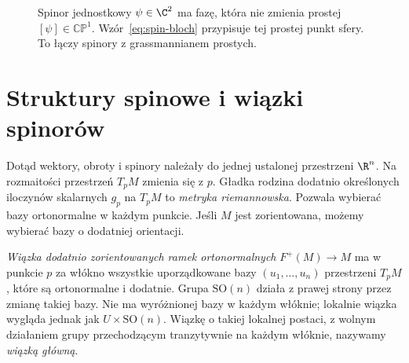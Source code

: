 \begin{figure}[!htbp]
\centering
{}
\caption{Spinor jednostkowy $\psi\in\C^2$ ma fazę,
która nie zmienia prostej $[\psi]\in\mathbb{CP}^1$.
Wzór~\eqref{eq:spin-bloch} przypisuje tej prostej
punkt sfery. To łączy spinory z grassmannianem prostych.}
\label{fig:spin-bloch}
\end{figure}

\section{Struktury spinowe i wiązki spinorów}
\label{sec:struktura-spinowa}

Dotąd wektory, obroty i spinory należały do jednej
ustalonej przestrzeni $\R^n$. Na rozmaitości
przestrzeń $T_pM$ zmienia się z $p$.
Gładka rodzina dodatnio określonych iloczynów
skalarnych $g_p$ na $T_pM$ to \emph{metryka
riemannowska}. Pozwala wybierać bazy ortonormalne
w każdym punkcie. Jeśli $M$ jest zorientowana,
możemy wybierać bazy o dodatniej orientacji.

\emph{Wiązka dodatnio zorientowanych ramek
ortonormalnych} $F^+(M)\to M$ ma w punkcie $p$
za włókno wszystkie uporządkowane bazy
$(u_1,\ldots,u_n)$ przestrzeni $T_pM$,
które są ortonormalne i dodatnie.
Grupa $\mathrm{SO}(n)$ działa z prawej strony
przez zmianę takiej bazy. Nie ma wyróżnionej
bazy w każdym włóknie; lokalnie wiązka wygląda
jednak jak $U\times\mathrm{SO}(n)$.
Wiązkę o takiej lokalnej postaci, z wolnym
działaniem grupy przechodzącym tranzytywnie
na każdym włóknie, nazywamy \emph{wiązką główną}.

